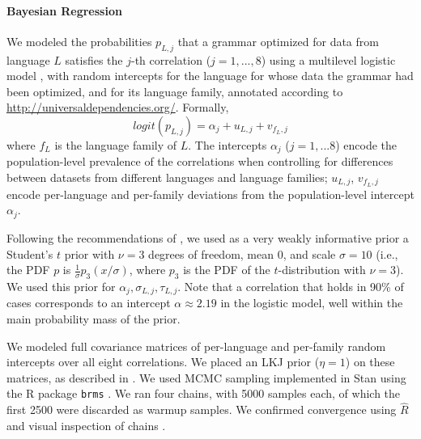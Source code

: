 \documentclass[10pt,twoside,lineno]{article}
\begin{document}
\paragraph{Bayesian Regression}
We modeled the probabilities $p_{L,j}$ that a grammar optimized for data from language $L$ satisfies the $j$-th correlation ($j=1,...,8$) using a multilevel logistic model \cite{gelman2013bayesian}, with random intercepts for the language for whose data the grammar had been optimized, and for its language family, annotated according to \url{http://universaldependencies.org/}.
Formally,
\begin{equation}\label{eq:mixed-effects}
logit(p_{L,j}) = \alpha_j + u_{L,j} + v_{f_L,j}
\end{equation}
where $f_L$ is the language family of $L$.
The intercepts $\alpha_j$ ($j=1,...8$) encode the population-level prevalence of the correlations when controlling for differences between datasets from different languages and language families; $u_{L,j}$, $v_{f_L,j}$ encode per-language and per-family deviations from the population-level intercept $\alpha_j$.



Following the recommendations of \cite{ghosh2018use, burkner2018advanced}, we used as a very weakly informative prior a Student's $t$ prior with $\nu=3$ degrees of freedom, mean 0, and scale $\sigma=10$ (i.e., the PDF $p$ is $\frac{1}{\sigma} p_3(x/\sigma)$, where $p_3$ is the PDF of the $t$-distribution with $\nu=3$).
We used this prior for $\alpha_j, \sigma_{L,j}, \tau_{L,j}$.
Note that a correlation that holds in 90\% of cases corresponds to an intercept $\alpha \approx 2.19$ in the logistic model, well within the main probability mass of the prior.

We modeled full covariance matrices of per-language and per-family random intercepts over all eight correlations. We placed an LKJ prior ($\eta=1$) on these matrices, as described in \cite{burkner2018advanced}.
We used MCMC sampling implemented in Stan \cite{carpenter2017stan, hoffman2014no} using the R package \texttt{brms} \cite{buerkner2017brms}.
We ran four chains, with 5000 samples each, of which the first 2500 were discarded as warmup samples.
We confirmed convergence using $\hat{R}$ and visual inspection of chains \cite{gelman2013bayesian}.
\end{document}
